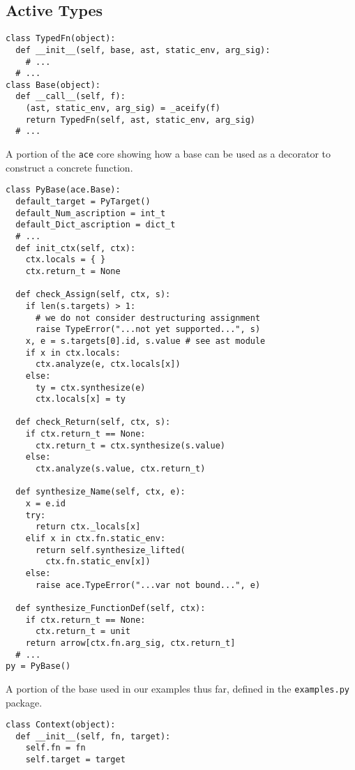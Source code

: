 \documentclass[10pt,preprint]{sigplanconf}
\begin{document}
{\subsection{Active Types}\label{atypes}
\begin{codelisting}
\begin{lstlisting}
class TypedFn(object):
  def __init__(self, base, ast, static_env, arg_sig):
    # ...
  # ...
class Base(object):
  def __call__(self, f):
    (ast, static_env, arg_sig) = _aceify(f)
    return TypedFn(self, ast, static_env, arg_sig)
  # ...
\end{lstlisting}
\caption{A portion of the \texttt{ace} core showing how a base can be used as a decorator to construct a concrete function.}
\label{base}
\end{codelisting}
\begin{codelisting}
\begin{lstlisting}
class PyBase(ace.Base):
  default_target = PyTarget()
  default_Num_ascription = int_t
  default_Dict_ascription = dict_t
  # ...
  def init_ctx(self, ctx):
    ctx.locals = { }
    ctx.return_t = None

  def check_Assign(self, ctx, s):
    if len(s.targets) > 1:
      # we do not consider destructuring assignment
      raise TypeError("...not yet supported...", s)
    x, e = s.targets[0].id, s.value # see ast module
	if x in ctx.locals:
	  ctx.analyze(e, ctx.locals[x])
	else:
	  ty = ctx.synthesize(e)
	  ctx.locals[x] = ty
              
  def check_Return(self, ctx, s):
    if ctx.return_t == None:
      ctx.return_t = ctx.synthesize(s.value)
    else:
      ctx.analyze(s.value, ctx.return_t)
      
  def synthesize_Name(self, ctx, e):
    x = e.id
    try:
      return ctx._locals[x]
    elif x in ctx.fn.static_env:
      return self.synthesize_lifted(
        ctx.fn.static_env[x])
    else:
      raise ace.TypeError("...var not bound...", e)

  def synthesize_FunctionDef(self, ctx):
    if ctx.return_t == None:
      ctx.return_t = unit
    return arrow[ctx.fn.arg_sig, ctx.return_t]
  # ...
py = PyBase()
\end{lstlisting}
\caption{A portion of the base used in our examples thus far, defined in the \texttt{examples.py} package.}
\label{pybase}
\end{codelisting}
\begin{codelisting}
\begin{lstlisting}
class Context(object):
  def __init__(self, fn, target):
    self.fn = fn
    self.target = target


\end{lstlisting}
\end{codelisting}}
\end{document}
